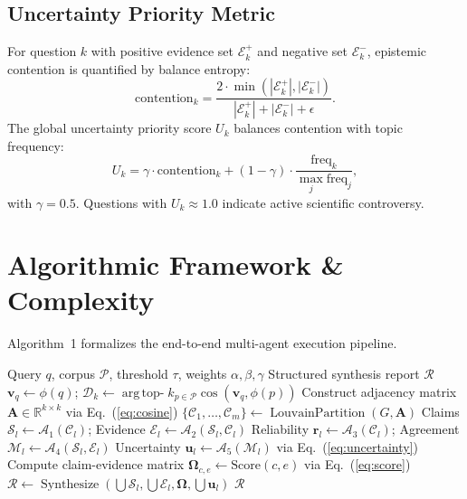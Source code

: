 \documentclass[conference]{IEEEtran}
\begin{document}
\subsection{Uncertainty Priority Metric}
For question $k$ with positive evidence set $\mathcal{E}^+_k$ and negative
set $\mathcal{E}^-_k$, epistemic contention is quantified by balance entropy:
\begin{equation}
\mathrm{contention}_k = \frac{2 \cdot \min(|\mathcal{E}^+_k|, |\mathcal{E}^-_k|)}{|\mathcal{E}^+_k| + |\mathcal{E}^-_k| + \epsilon}.
\end{equation}
The global uncertainty priority score $U_k$ balances contention with topic
frequency:
\begin{equation}
U_k = \gamma \cdot \mathrm{contention}_k + (1-\gamma) \cdot \frac{\mathrm{freq}_k}{\max_j \mathrm{freq}_j},
\label{eq:uncertainty}
\end{equation}
with $\gamma = 0.5$. Questions with $U_k \approx 1.0$ indicate active scientific controversy.

\section{Algorithmic Framework \& Complexity}

Algorithm~1 formalizes the end-to-end multi-agent execution pipeline.

\begin{algorithm}[!t]
\caption{Multi-Agent Epistemic Literature Synthesis}
\label{alg:pipeline}
\begin{algorithmic}[1]
\REQUIRE Query $q$, corpus $\mathcal{P}$, threshold $\tau$, weights $\alpha,\beta,\gamma$
\ENSURE Structured synthesis report $\mathcal{R}$
\STATE $\mathbf{v}_q \leftarrow \phi(q)$; \quad $\mathcal{D}_k \leftarrow \operatorname{arg\,top-}k_{p \in \mathcal{P}} \cos(\mathbf{v}_q, \phi(p))$
\STATE Construct adjacency matrix $\mathbf{A} \in \mathbb{R}^{k \times k}$ via Eq.~(\ref{eq:cosine})
\STATE $\{\mathcal{C}_1, \dots, \mathcal{C}_m\} \leftarrow \operatorname{LouvainPartition}(G, \mathbf{A})$
  \STATE Claims $\mathcal{S}_l \leftarrow \mathcal{A}_1(\mathcal{C}_l)$; \quad Evidence $\mathcal{E}_l \leftarrow \mathcal{A}_2(\mathcal{S}_l, \mathcal{C}_l)$
  \STATE Reliability $\mathbf{r}_l \leftarrow \mathcal{A}_3(\mathcal{C}_l)$; \quad Agreement $\mathcal{M}_l \leftarrow \mathcal{A}_4(\mathcal{S}_l, \mathcal{E}_l)$
  \STATE Uncertainty $\mathbf{u}_l \leftarrow \mathcal{A}_5(\mathcal{M}_l)$ via Eq.~(\ref{eq:uncertainty})
\ENDFOR
\STATE Compute claim-evidence matrix $\mathbf{\Omega}_{c,e} \leftarrow \mathrm{Score}(c,e)$ via Eq.~(\ref{eq:score})
\STATE $\mathcal{R} \leftarrow \operatorname{Synthesize}(\bigcup \mathcal{S}_l, \bigcup \mathcal{E}_l, \mathbf{\Omega}, \bigcup \mathbf{u}_l)$
\RETURN $\mathcal{R}$
\end{algorithmic}
\end{algorithm}
\end{document}
